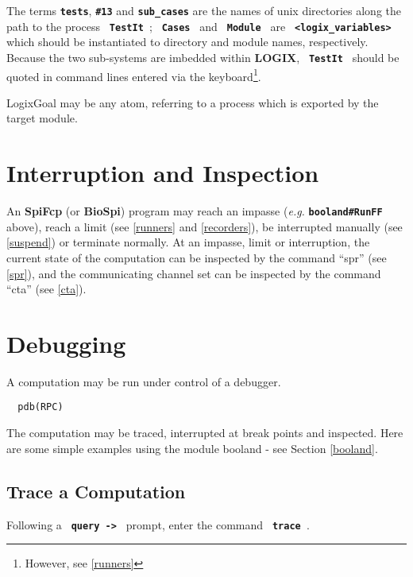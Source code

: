 \documentclass[twoside,10pt]{report}
\begin{document}
\noindent
The terms {\bf \verb+tests+}, {\bf \verb+#13+} and
{\bf \verb+sub_cases+} are the names of unix directories along the
path to the process  {\bf \verb+ TestIt +}; {\bf \verb+ Cases +} and
{\bf \verb+ Module +} are {\bf \verb+ <logix_variables> +}
\newline which should be
instantiated to directory and module names, respectively. Because
the two sub-systems are imbedded within {\bf LOGIX}, {\bf \verb+ TestIt +}
should be quoted in command lines entered via the keyboard\footnote{
However, see \ref{runners}
}.

\noindent
LogixGoal may be any atom, referring to a process which is exported by
the target module.

\section{Interruption and Inspection}

An {\bf SpiFcp} (or {\bf BioSpi}) program may reach an impasse ({\em e.g.} {\bf \verb+booland#RunFF+}
above), reach a limit (see \ref{runners} and \ref{recorders}), be interrupted
manually (see \ref{suspend}) or terminate normally.  At an impasse,
limit or interruption, the current state of the
computation can be inspected by the command ``spr'' (see \ref{spr}),
and the communicating channel set can be inspected by the command ``cta''
(see \ref{cta}).

\section{Debugging}
\label{debugger}

A computation may be run under control of a debugger.

\begin{verbatim}
  pdb(RPC)
\end{verbatim}

\noindent
The computation may be traced, interrupted at break points and
inspected.  Here are some simple examples using the module booland -
see Section \ref{booland}.

\subsection{Trace a Computation}
\label{debug trace}

Following a {\bf \verb+ query -> +} prompt, enter the command {\bf \verb+ trace +}.
\end{document}
